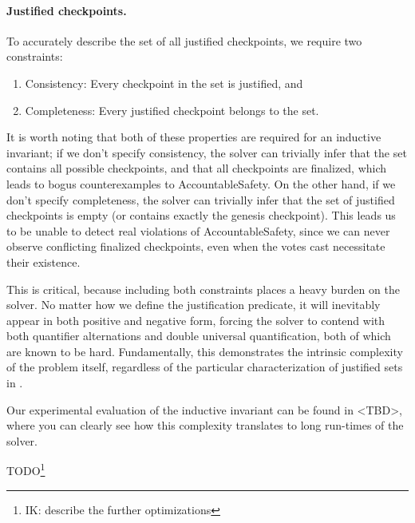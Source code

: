 \paragraph{Justified checkpoints.} To accurately describe the set of all justified checkpoints, we require two constraints:
\begin{enumerate}
	\item Consistency: Every checkpoint in the set is justified, and 
	\item Completeness: Every justified checkpoint belongs to the set.
\end{enumerate}
It is worth noting that both of these properties are required for an inductive invariant; if we don't specify consistency, the solver can trivially infer that the set contains all possible checkpoints, and that all checkpoints are finalized, which leads to bogus counterexamples to \textsf{AccountableSafety}.
On the other hand, if we don't specify completeness, the solver can trivially infer that the set of justified checkpoints is empty (or contains exactly the genesis checkpoint). This leads us to be unable to detect real violations of \textsf{AccountableSafety}, since we can never observe conflicting finalized checkpoints, even when the votes cast necessitate their existence.

This is critical, because including both constraints places a heavy burden on the solver. No matter how we define the justification predicate, it will inevitably appear in both positive and negative form, forcing the solver to contend with both quantifier alternations and double universal quantification, both of which are known to be hard.
Fundamentally, this demonstrates the intrinsic complexity of the problem itself, regardless of the particular characterization of justified sets in \tlap{}.

Our experimental evaluation of the inductive invariant can be found in <TBD>, where you can clearly see how this complexity translates to long run-times of the solver.


TODO\footnote{IK: describe the further optimizations}

